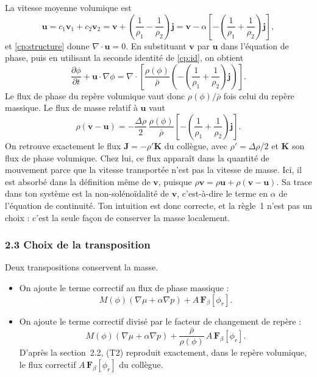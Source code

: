 La vitesse moyenne volumique est
\begin{equation}
  \mathbf{u} = c_1\mathbf{v}_1 + c_2\mathbf{v}_2
  = \mathbf{v} + \left(\frac{1}{\rho_1}-\frac{1}{\rho_2}\right)\mathbf{j}
  = \mathbf{v} - \alpha\left[-\left(\frac{1}{\rho_1}+\frac{1}{\rho_2}\right)\mathbf{j}\right],
\end{equation}
et \eqref{cp:structure} donne $\nabla\cdot\mathbf{u}=0$. En substituant $\mathbf{v}$ par $\mathbf{u}$ dans l'équation de phase, puis en utilisant la seconde identité de \eqref{cp:id}, on obtient
\begin{equation}
  \frac{\partial\phi}{\partial t} + \mathbf{u}\cdot\nabla\phi
  = \nabla\cdot\left[\frac{\rho(\phi)}{\bar{\rho}}\left(-\left(\frac{1}{\rho_1}+\frac{1}{\rho_2}\right)\mathbf{j}\right)\right].
\end{equation}
Le flux de phase du repère volumique vaut donc $\rho(\phi)/\bar{\rho}$ fois celui du repère massique. Le flux de masse relatif à $\mathbf{u}$ vaut
\begin{equation}
  \rho\left(\mathbf{v}-\mathbf{u}\right)
  = -\frac{\Delta\rho}{2}\,\frac{\rho(\phi)}{\bar{\rho}}\left[-\left(\frac{1}{\rho_1}+\frac{1}{\rho_2}\right)\mathbf{j}\right].
\end{equation}
On retrouve exactement le flux $\boldsymbol{J}=-\rho'\boldsymbol{K}$ du collègue, avec $\rho'=\Delta\rho/2$ et $\boldsymbol{K}$ son flux de phase volumique. Chez lui, ce flux apparaît dans la quantité de mouvement parce que la vitesse transportée n'est pas la vitesse de masse. Ici, il est absorbé dans la définition même de $\mathbf{v}$, puisque $\rho\mathbf{v} = \rho\mathbf{u} + \rho(\mathbf{v}-\mathbf{u})$. Sa trace dans ton système est la non-solénoïdalité de $\mathbf{v}$, c'est-à-dire le terme en $\alpha$ de l'équation de continuité. Ton intuition est donc correcte, et la règle~1 n'est pas un choix : c'est la seule façon de conserver la masse localement.

\subsubsection*{2.3 Choix de la transposition}

Deux transpositions conservent la masse.
\begin{itemize}
  \item[(T1)] On ajoute le terme correctif au flux de phase massique :
  \begin{equation}
    M(\phi)\left(\nabla\mu+\alpha\nabla p\right) + A\,\mathbf{F}_\beta[\phi_r].
  \end{equation}
  \item[(T2)] On ajoute le terme correctif divisé par le facteur de changement de repère :
  \begin{equation}
    M(\phi)\left(\nabla\mu+\alpha\nabla p\right) + \frac{\bar{\rho}}{\rho(\phi)}\,A\,\mathbf{F}_\beta[\phi_r].
  \end{equation}
  D'après la section~2.2, (T2) reproduit exactement, dans le repère volumique, le flux correctif $A\,\mathbf{F}_\beta[\phi_r]$ du collègue.
\end{itemize}

